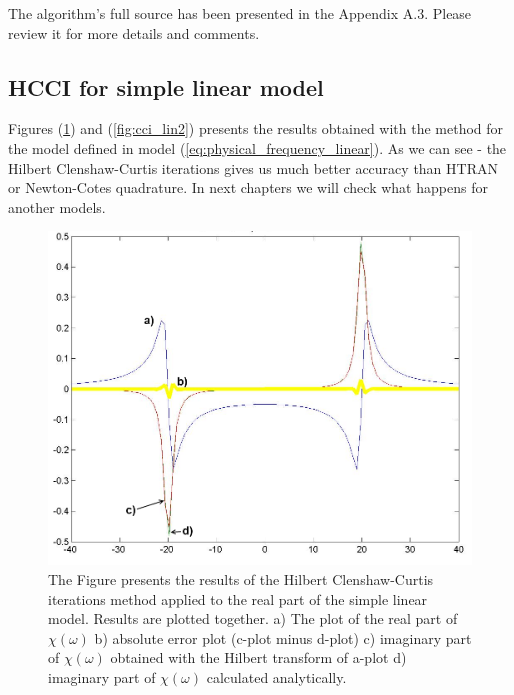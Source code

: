 \documentclass[12pt,twoside,a4paper]{article}
\def\emptyline{\vspace{12pt}}
\numberwithin{equation}{subsection}
\numberwithin{figure}{subsection}
\begin{document}
\emptyline

The algorithm's full source has been presented in the Appendix A.3. Please review it for more details and comments.

\subsection{HCCI for simple linear model} \label{chap:hcc_lin}

Figures (\ref{fig:cci_lin1}) and (\ref{fig:cci_lin2}) presents the results obtained with the method for the model defined in
model (\ref{eq:physical_frequency_linear}). As we can see - the Hilbert Clenshaw-Curtis iterations gives us much better accuracy than HTRAN
or Newton-Cotes quadrature. In next chapters we will check what happens for another models.

\begin{figure} 
  \includegraphics[width=150mm]{img/hcc_lin1.png}
  \caption{The Figure presents the results of the Hilbert Clenshaw-Curtis iterations method applied to the real part of the simple linear
  model. Results are plotted together.
   a) The plot of the real part of $\chi (\omega )$ 
   b) absolute error plot (c-plot minus d-plot) 
   c) imaginary part of $\chi (\omega )$ obtained with the Hilbert transform of a-plot 
   d) imaginary part of $\chi (\omega )$  calculated analytically. \label{fig:cci_lin1}
  }
\end{figure}
\end{document}
